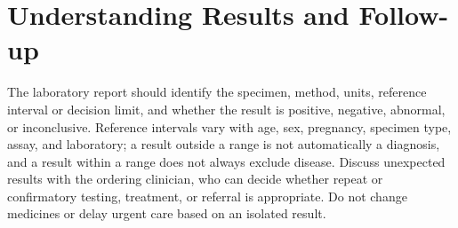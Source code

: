 \section*{Understanding Results and Follow-up}
The laboratory report should identify the specimen, method, units, reference interval or decision limit, and whether the result is positive, negative, abnormal, or inconclusive. Reference intervals vary with age, sex, pregnancy, specimen type, assay, and laboratory; a result outside a range is not automatically a diagnosis, and a result within a range does not always exclude disease. Discuss unexpected results with the ordering clinician, who can decide whether repeat or confirmatory testing, treatment, or referral is appropriate. Do not change medicines or delay urgent care based on an isolated result.
